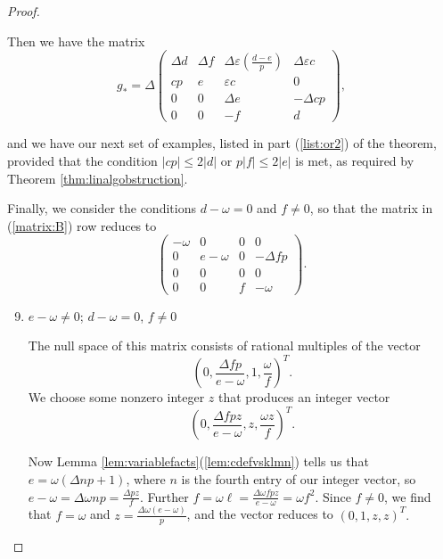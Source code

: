 \documentclass{amsart}     %
\theoremstyle{definition}
\begin{document}
\begin{proof}
\begin{enumerate}
\begin{enumerate}
Then we have the matrix 
\[g_* = \Delta \begin{pmatrix}  \Delta d & \Delta f & \Delta \varepsilon \left(\frac{d-e}{p}\right) & \Delta \varepsilon c \\
cp &  e &  \varepsilon  c & 0 \\ 
0 & 0 & \Delta e & -\Delta cp \\ 
0 & 0 & - f &  d \end{pmatrix},\]

and we have our next set of examples, listed in part (\ref{list:or2}) of the theorem, provided that the condition $|cp | \leq 2|d| $ or $p| f |  \leq  2 | e |$ is met, as required by Theorem \ref{thm:linalgobstruction}.

\end{enumerate}
\end{enumerate}


Finally, we consider the conditions $d-\omega  = 0$ and $f \neq 0$, so that the matrix in (\ref{matrix:B}) row reduces to
%
\[ \begin{pmatrix} -\omega  & 0 & 0 & 0 \\
 0& e - \omega  & 0 & -\Delta f p\\ 
0 & 0 & 0  & 0 \\ 
0 & 0 & f & - \omega\end{pmatrix}.\]


\begin{enumerate}\setcounter{enumi}{8}


\item\label{case:beige} $e-\omega  \neq 0$; $d - \omega  = 0$, $f \neq 0$ 

The null space of this matrix consists of rational multiples of the vector $$\left(0, \frac{\Delta f p}{e- \omega },1, \frac{\omega }{f}\right)^T.$$ We choose some nonzero integer $z$ that produces an integer vector
$$\left(0, \frac{\Delta f pz}{e- \omega },z, \frac{\omega  z}{f}\right)^T.$$

Now Lemma \ref{lem:variablefacts}(\ref{lem:cdefvsklmn}) tells us that $e = \omega(\Delta np + 1)$, where $n$ is the fourth entry of our integer vector, so $e - \omega  = \Delta \omega np = \frac{\Delta  p z}{f}$. Further $f = \omega \ell =   \frac{\Delta \omega f pz}{e- \omega } = \omega f^2$. Since $f \neq 0$, we find that $f = \omega$ and $z = \frac{\Delta \omega (e-\omega)}{p}$, and the vector reduces to  
$\left(0, 1,z, z\right)^T.$


\end{enumerate}
\end{proof}
\end{document}
